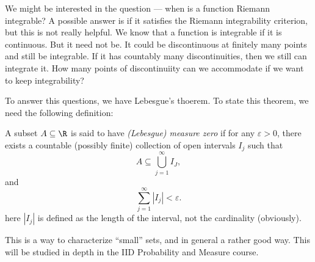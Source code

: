 \documentclass[a4paper]{article}
\begin{document}
We might be interested in the question --- when is a function Riemann integrable? A possible answer is if it satisfies the Riemann integrability criterion, but this is not really helpful. We know that a function is integrable if it is continuous. But it need not be. It could be discontinuous at finitely many points and still be integrable. If it has countably many discontinuities, then we still can integrate it. How many points of discontinuiity can we accommodate if we want to keep integrability?

To answer this questions, we have Lebesgue's thoerem. To state this theorem, we need the following definition:
\begin{defi}
  A subset $A\subseteq \R$ is said to have \emph{(Lebesgue) measure zero} if for any $\varepsilon > 0$, there exists a countable (possibly finite) collection of open intervals $I_j$ such that
  \[
    A \subseteq \bigcup_{j = 1}^\infty I_J,
  \]
  and
  \[
    \sum_{j = 1}^\infty | I_j| < \varepsilon.
  \]
  here $|I_j|$ is defined as the length of the interval, not the cardinality (obviously).
\end{defi}
This is a way to characterize ``small'' sets, and in general a rather good way. This will be studied in depth in the IID Probability and Measure course.
\end{document}
